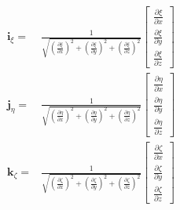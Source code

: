 \documentclass
[
a4paper,                      %
twoside,					  %
12pt,                         %
abstract,		      %
fleqn,                        %
]
{scrartcl} %
\begin{document}
\begin{equation}
\begin{aligned}
\mathbf{i}_{\xi}=&\frac{1}{\sqrt{\left(\frac{\partial\xi}{\partial x}\right)^{2}+\left(\frac{\partial\xi}{\partial y}\right)^{2}+\left(\frac{\partial\xi}{\partial z}\right)^{2}}}\begin{bmatrix}
\frac{\partial\xi}{\partial x}\\[5pt]
\frac{\partial\xi}{\partial y}\\[5pt]
\frac{\partial\xi}{\partial z}\end{bmatrix}\\\mathbf{j}_{\eta}=&\frac{1}{\sqrt{\left(\frac{\partial\eta}{\partial x}\right)^{2}+\left(\frac{\partial\eta}{\partial y}\right)^{2}+\left(\frac{\partial\eta}{\partial z}\right)^{2}}}\begin{bmatrix}
\frac{\partial\eta}{\partial x}\\[5pt]
\frac{\partial\eta}{\partial y}\\[5pt]
\frac{\partial\eta}{\partial z}\end{bmatrix}\\\mathbf{k}_{\zeta}=&\frac{1}{\sqrt{\left(\frac{\partial\zeta}{\partial x}\right)^{2}+\left(\frac{\partial\zeta}{\partial y}\right)^{2}+\left(\frac{\partial\zeta}{\partial z}\right)^{2}}}\begin{bmatrix}
\frac{\partial\zeta}{\partial x}\\[5pt]
\frac{\partial\zeta}{\partial y}\\[5pt]
\frac{\partial\zeta}{\partial z}
\end{bmatrix}
\end{aligned}
\end{equation}
\end{document}
